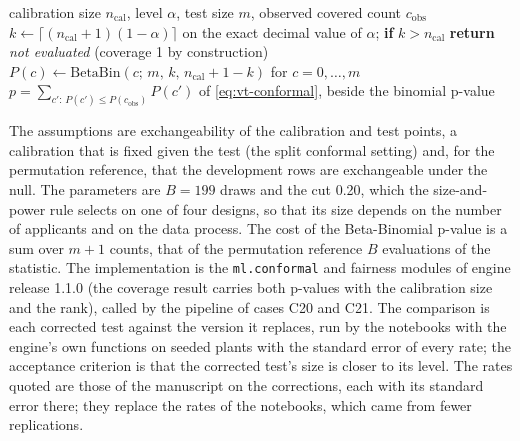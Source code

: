 \begin{algorithm}[htbp]
\caption{The Beta-Binomial p-value of the coverage of a split conformal predictor.}
\label{alg:bs10}
\begin{algorithmic}[1]
\Require calibration size $n_{\mathrm{cal}}$, level $\alpha$, test size $m$, observed covered count $c_{\mathrm{obs}}$
\State $k\gets\lceil (n_{\mathrm{cal}}+1)(1-\alpha)\rceil$ on the exact decimal value of $\alpha$; \textbf{if} $k>n_{\mathrm{cal}}$ \textbf{return} \emph{not evaluated} (coverage 1 by construction)
\State $P(c)\gets \mathrm{BetaBin}(c;\,m,\,k,\,n_{\mathrm{cal}}+1-k)$ for $c=0,\dots,m$
\State \Return $p=\sum_{c':\,P(c')\le P(c_{\mathrm{obs}})}P(c')$ of \cref{eq:vt-conformal}, beside the binomial p-value
\end{algorithmic}
\end{algorithm}

The assumptions are exchangeability of the calibration and test points, a calibration that is fixed given the test (the split conformal setting) and, for the permutation reference, that the
development rows are exchangeable under the null. The parameters are $B=199$ draws and the cut 0.20, which the size-and-power rule selects on one of four designs, so that its size depends on the number of applicants and on the data process. The cost of the
Beta-Binomial p-value is a sum over $m+1$ counts, that of the permutation reference $B$ evaluations of the statistic. The implementation is the \texttt{ml.conformal} and fairness modules of engine release 1.1.0
(the coverage result carries both p-values with the calibration size and the rank), called by the pipeline of cases C20 and C21. The comparison is each corrected test against the version it replaces, run by the notebooks
with the engine's own functions on seeded plants with the standard error of every rate; the acceptance criterion is that the corrected test's size is closer to its level. The rates quoted are those of the manuscript on the corrections, each with its standard error there; they replace the rates of the notebooks, which came from fewer replications.

